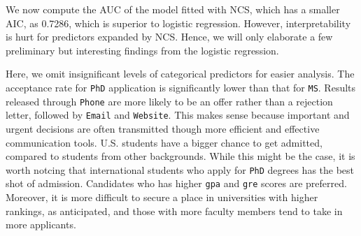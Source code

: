 \par We now compute the AUC of the model fitted with NCS, which has a smaller AIC, as 0.7286, which is superior to logistic regression. However, interpretability is hurt for predictors expanded by NCS. Hence, we will only elaborate a few preliminary but interesting findings from the logistic regression. 
\par Here, we omit insignificant levels of categorical predictors for easier analysis. The acceptance rate for \texttt{PhD} application is significantly lower than that for \texttt{MS}. Results released through \texttt{Phone} are more likely to be an offer rather than a rejection letter, followed by \texttt{Email} and \texttt{Website}. This makes sense because important and urgent decisions are often transmitted though more efficient and effective communication tools. U.S. students have a bigger chance to get admitted, compared to students from other backgrounds. While this might be the case, it is worth notcing that international students who apply for \texttt{PhD} degrees has the best shot of admission. Candidates who has higher \texttt{gpa} and \texttt{gre} scores are preferred. Moreover, it is more difficult to secure a place in universities with higher rankings, as anticipated, and those with more faculty members tend to take in more applicants.
